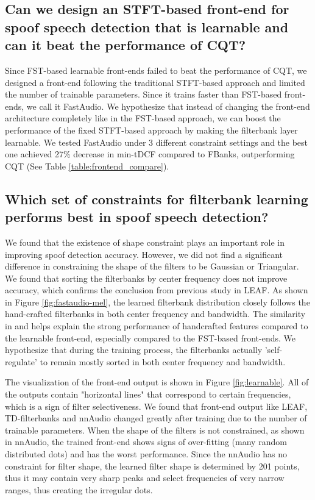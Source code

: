 \documentclass[conference]{IEEEtran}
\begin{document}
\subsection{\label{constraint.subsection}\textbf{Can we design an STFT-based front-end for spoof speech detection that is learnable and can it beat the performance of CQT?} }

Since FST-based learnable front-ends failed to beat the performance of CQT, we designed a front-end following the traditional STFT-based approach and limited the number of trainable parameters. Since it trains faster than FST-based front-ends, we call it FastAudio. We hypothesize that instead of changing the front-end architecture completely like in the FST-based approach, we can boost the performance of the fixed STFT-based approach by making the filterbank layer learnable. We tested FastAudio under 3 different constraint settings and the best one achieved 27\% decrease in min-tDCF compared to FBanks, outperforming CQT (See Table \ref{table:frontend_compare}).

\subsection{\textbf{Which set of constraints for filterbank learning performs best in spoof speech detection?}}

We found that the existence of shape constraint plays an important role in improving spoof detection accuracy. However, we did not find a significant difference in constraining the shape of the filters to be Gaussian or Triangular. We found that sorting the filterbanks by center frequency does not improve accuracy, which confirms the conclusion from previous study in LEAF\cite{Zeghidour2021LEAFAL}. As shown in Figure \ref{fig:fastaudio-mel}, the learned filterbank distribution closely follows the hand-crafted filterbanks in both center frequency and bandwidth. The similarity in  and  helps explain the strong performance of handcrafted features compared to the learnable front-end, especially compared to the FST-based front-ends. We hypothesize that during the training process, the filterbanks actually 'self-regulate' to remain mostly sorted in both center frequency and bandwidth. 

The visualization of the front-end output is shown in Figure \ref{fig:learnable}. All of the outputs contain "horizontal lines" that correspond to certain frequencies, which is a sign of filter selectiveness. We found that front-end output like LEAF, TD-filterbanks and nnAudio changed greatly after training due to the number of trainable parameters. When the shape of the filters is not constrained, as shown in nnAudio, the trained front-end shows signs of over-fitting (many random distributed dots) and has the worst performance. Since the nnAudio has no constraint for filter shape, the learned filter shape is determined by 201 points, thus it may contain very sharp peaks and select frequencies of very narrow ranges, thus creating the irregular dots.
\end{document}
